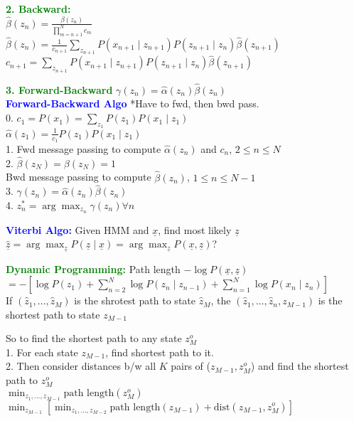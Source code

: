 \documentclass[5pt]{extarticle} %
\begin{document}
\begin{paracol}{3}
{    \textcolor{green}{\textbf{2. Backward:}} \\
    $\hat{\beta}(z_n) = \frac{\beta(z_n)}{\prod_{m=n+1}^N c_m}$ \\
    $\boxed{\hat{\beta}(z_n) = \frac{1}{c_{n+1}} \sum_{z_{n+1}} P(x_{n+1} \mid z_{n+1}) P(z_{n+1} \mid z_n) \hat{\beta}(z_{n+1})}$ \\
    $\boxed{c_{n+1} = \sum_{z_{n+1}} P(x_{n+1} \mid z_{n+1}) P(z_{n+1} \mid z_n) \hat{\beta}(z_{n+1})}$

    \textcolor{green}{\textbf{3. Forward-Backward}} $\boxed{\gamma (z_n) = \hat{\alpha}(z_n) \hat{\beta}(z_n)}$ \\

    \textcolor{blue}{\textbf{Forward-Backward Algo}} 
    *Have to fwd, then bwd pass. \\
    0. $c_1 = P(x_1) = \sum_{z_1} P(z_1) P(x_1 \mid z_1)$ \\
    $\hat{\alpha}(z_1) = \frac{1}{c_1} P(z_1) P(x_1 \mid z_1) $ \\
    1. Fwd message passing to compute $\hat{\alpha}(z_n)$ and $c_n$, $2 \leq n \leq N$ \\
    2. $\hat{\beta}(z_N) = \beta(z_N) =1$ \\
    Bwd message passing to compute $\hat{\beta}(z_n)$, $1 \leq n \leq N-1$ \\
    3. $\gamma(z_n) = \hat{\alpha}(z_n) \hat{\beta}(z_n)$ \\
    4. $z_n^* = \arg \max_{z_n} \gamma(z_n) \forall n$

    \textcolor{blue}{\textbf{Viterbi Algo:}} Given HMM and $\underline{x}$, find most likely $\underline{z}$ \\
    $\hat{\underline{z}} = \arg \max_{\underline{z}} P(\underline{z} \mid \underline{x}) = \arg \max_{\underline{z}} P(\underline{x}, \underline{z})$?

    \textcolor{green}{\textbf{Dynamic Programming:}} Path length $- \log P(\underline{x}, \underline{z})$ \\ $= - \left[\log P(z_1) + \sum_{n=2}^N \log P(z_n \mid z_{n-1}) + \sum_{n=1}^N \log P(x_n \mid z_n)\right]$ \\
    If $(\hat{z}_1,\ldots,\hat{z}_M)$ is the shrotest path to state $\hat{z}_M$, the $(\hat{z}_1,\ldots,\hat{z}_n,z_{M-1})$ is the shortest path to state $z_{M-1}$ 
    
    So to find the shortest path to any state $z_M^o$ \\
    1. For each state $z_{M-1}$, find shortest path to it. \\
    2. Then consider distances b/w all $K$ pairs of ($z_{M-1},z_M^o$) and find the shortest path to $z_M^o$ \\
    $\min_{z_1,\ldots,z_{M-1}} \text{path length}(z_M^o)$ \\
    $\min_{z_{M-1}} \left[ \min_{z_1,\ldots,z_{M-2}} \text{path length}(z_{M-1}) + \text{dist} (z_{M-1},z_M^o)\right]$ 

}
\end{paracol}
\end{document}
